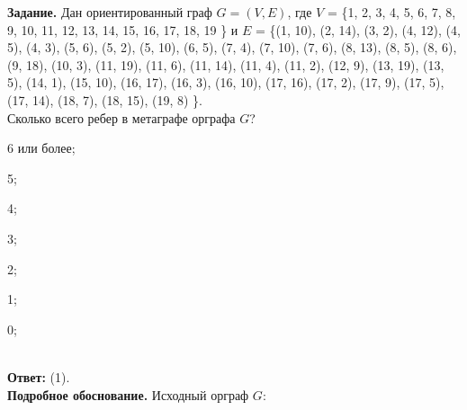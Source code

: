 \documentclass{article}
\begin{document}
\pagestyle{empty}


\noindent\textbf{Задание.} Дан ориентированный граф $G = (V, E)$, где
$V$ = \{1, 2, 3, 4, 5, 6, 7, 8, 9, 10, 11, 12, 13, 14, 15, 16, 17, 18, 19 \} и $E$ = \{(1, 10), (2, 14), (3, 2), (4, 12), (4, 5), (4, 3), (5, 6), (5, 2), (5, 10), (6, 5), (7, 4), (7, 10), (7, 6), (8, 13), (8, 5), (8, 6), (9, 18), (10, 3), (11, 19), (11, 6), (11, 14), (11, 4), (11, 2), (12, 9), (13, 19), (13, 5), (14, 1), (15, 10), (16, 17), (16, 3), (16, 10), (17, 16), (17, 2), (17, 9), (17, 5), (17, 14), (18, 7), (18, 15), (19, 8) \}.\\
Сколько всего ребер в метаграфе орграфа $G$?
\vspace{2mm}

\noindent\begin{inparaenum}[(1)]
\item 6 или более;
 \item 5; \item 4; \item 3; \item 2; \item 1; \item 0;\end{inparaenum}\\



\noindent\textbf{Ответ:} (1).\\



\noindent\textbf{Подробное обоснование.}
Исходный орграф $G$:
\vspace{8mm}
\end{document}
